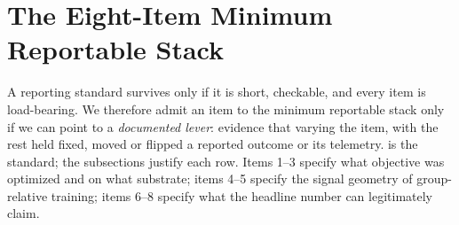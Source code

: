 \section{The Eight-Item Minimum Reportable Stack}
\label{sec:p5-stack}
A reporting standard survives only if it is short, checkable, and every item is
load-bearing. We therefore admit an item to the minimum reportable stack only
if we can point to a \emph{documented lever}: evidence that varying the item,
with the rest held fixed, moved or flipped a reported outcome or its
telemetry.  is the standard; the subsections justify
each row. Items 1--3 specify what objective was optimized and on what
substrate; items 4--5 specify the signal geometry of group-relative training;
items 6--8 specify what the headline number can legitimately claim.

